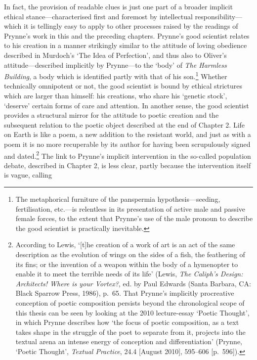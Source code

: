 \documentclass[]{article}
\begin{document}
In fact, the provision of readable clues is just one part of a broader
implicit ethical stance---characterised first and foremost by
intellectual responsibility---which it is tellingly easy to apply to
other processes raised by the readings of Prynne's work in this and the
preceding chapters. Prynne's good scientist relates to his creation in a
manner strikingly similar to the attitude of loving obedience described
in Murdoch's `The Idea of Perfection', and thus also to Oliver's
attitude---described implicitly by Prynne---to the `body' of \emph{The
Harmless Building}, a body which is identified partly with that of his
son.\footnote{The metaphorical furniture of the panspermia
  hypothesis---seeding, fertilisation, etc.---is relentless in its
  presentation of active male and passive female forces, to the extent
  that Prynne's use of the male pronoun to describe the good scientist
  is practically inevitable.} Whether technically omnipotent or not, the
good scientist is bound by ethical strictures which are larger than
himself: his creations, who share his `genetic stock', `deserve' certain
forms of care and attention. In another sense, the good scientist
provides a structural mirror for the attitude to poetic creation and the
subsequent relation to the poetic object described at the end of Chapter
2. Life on Earth is like a poem, a new addition to the resistant world,
and just as with a poem it is no more recuperable by its author for
having been scrupulously signed and dated.\footnote{According to Lewis,
  `{[}t{]}he creation of a work of art is an act of the same description
  as the evolution of wings on the sides of a fish, the feathering of
  its fins; or the invention of a weapon within the body of a hymenopter
  to enable it to meet the terrible needs of its life' (Lewis, \emph{The
  Caliph's Design: Architects! Where is your Vortex?}, ed. by Paul
  Edwards (Santa Barbara, CA: Black Sparrow Press, 1986), p.~65. That
  Prynne's implicitly procreative conception of poetic composition
  persists beyond the chronological scope of this thesis can be seen by
  looking at the 2010 lecture-essay `Poetic Thought', in which Prynne
  describes how `the focus of poetic composition, as a text takes shape
  in the struggle of the poet to separate from it, projects into the
  textual arena an intense energy of conception and differentiation'
  (Prynne, `Poetic Thought', \emph{Textual Practice}, 24.4 {[}August
  2010{]}, 595--606 {[}p.~596{]}).} The link to Prynne's implicit
intervention in the so-called population debate, described in Chapter 2,
is less clear, partly because the intervention itself is vague, calling
\end{document}
